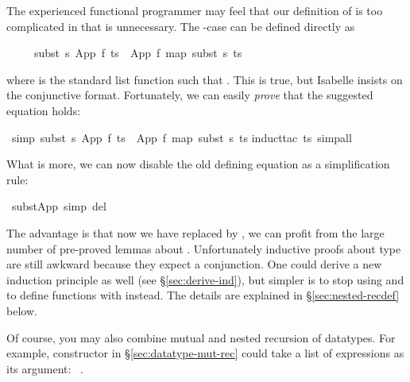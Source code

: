 \begin{isabellebody}
\begin{isamarkuptext}
The experienced functional programmer may feel that our definition of
 is too complicated in that  is
unnecessary. The -case can be defined directly as
\begin{isabelle}%
\ \ \ \ \ subst\ s\ {\isacharparenleft}App\ f\ ts{\isacharparenright}\ {\isacharequal}\ App\ f\ {\isacharparenleft}map\ {\isacharparenleft}subst\ s{\isacharparenright}\ ts{\isacharparenright}%
\end{isabelle}
where  is the standard list function such that
. This is true, but Isabelle
insists on the conjunctive format. Fortunately, we can easily \emph{prove}
that the suggested equation holds:%
\end{isamarkuptext}%
\ {\isacharbrackleft}simp{\isacharbrackright}{\isacharcolon}\ {\isachardoublequote}subst\ s\ {\isacharparenleft}App\ f\ ts{\isacharparenright}\ {\isacharequal}\ App\ f\ {\isacharparenleft}map\ {\isacharparenleft}subst\ s{\isacharparenright}\ ts{\isacharparenright}{\isachardoublequote}\isanewline
{}induct{\isacharunderscore}tac\ ts{\isacharcomma}\ simp{\isacharunderscore}all{\isacharparenright}\isanewline
{}%
\begin{isamarkuptext}%
\noindent
What is more, we can now disable the old defining equation as a
simplification rule:%
\end{isamarkuptext}%
\ subst{\isacharunderscore}App\ {\isacharbrackleft}simp\ del{\isacharbrackright}%
\begin{isamarkuptext}%
\noindent
The advantage is that now we have replaced  by
, we can profit from the large number of pre-proved lemmas
about .  Unfortunately inductive proofs about type
 are still awkward because they expect a conjunction. One
could derive a new induction principle as well (see
\S\ref{sec:derive-ind}), but simpler is to stop using 
and to define functions with  instead.
The details are explained in \S\ref{sec:nested-recdef} below.

Of course, you may also combine mutual and nested recursion of datatypes. For example,
constructor  in \S\ref{sec:datatype-mut-rec} could take a list of
expressions as its argument: ~.%
\end{isamarkuptext}%
\end{isabellebody}%
